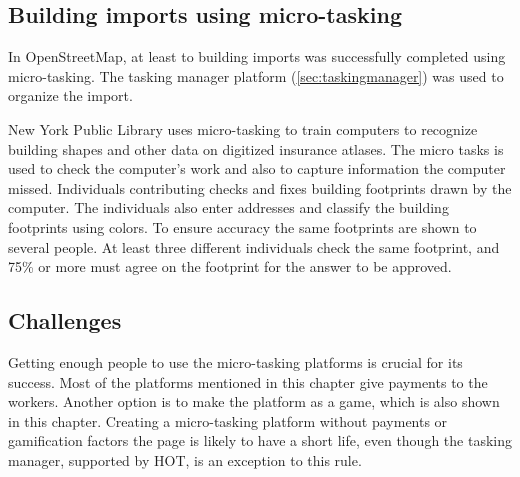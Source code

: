 
\subsection{Building imports using micro-tasking}
In OpenStreetMap, at least to building imports was successfully completed using micro-tasking. The tasking manager platform (\ref{sec:taskingmanager}) was used to organize the import. 


New York Public Library uses micro-tasking to train computers to recognize building shapes and other data on digitized insurance atlases. %
The micro tasks is used to check the computer's work and also to capture information the computer missed. Individuals contributing checks and fixes building footprints drawn by the computer. The individuals also enter addresses and classify the building footprints using colors. To ensure accuracy the same footprints are shown to several people. At least three different individuals check the same footprint, and 75\% or more must agree on the footprint for the answer to be approved. 

\subsection{Challenges}
Getting enough people to use the micro-tasking platforms is crucial for its success. Most of the platforms mentioned in this chapter give payments to the workers. Another option is to make the platform as a game, which is also shown in this chapter. Creating a micro-tasking platform without payments or gamification factors the page is likely to have a short life, even though the tasking manager, supported by HOT, is an exception to this rule. 

